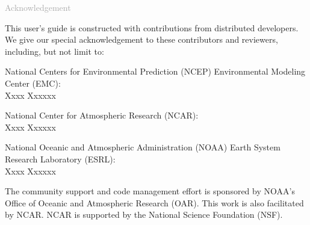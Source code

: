 \begin{titlepage}
\vspace*{0.5cm}
\noindent

\begin{flushleft}
\textcolor{darkgray}{\LARGE Acknowledgement}
\vspace*{1cm}\par

This user's guide is constructed with contributions from distributed developers. We give our special acknowledgement to these contributors and reviewers, including, but not limit to:

National Centers for Environmental Prediction (NCEP) Environmental Modeling Center (EMC): \\
Xxxx Xxxxxx

National Center for Atmospheric Research (NCAR): \\
Xxxx Xxxxxx

National Oceanic and Atmospheric Administration (NOAA) Earth System Research Laboratory (ESRL): \\
Xxxx Xxxxxx

The community support and code management effort is sponsored by NOAA's Office of Oceanic and Atmospheric Research (OAR). This work is also facilitated by NCAR. NCAR is supported by the National Science Foundation (NSF).

\end{flushleft}
\end{titlepage}
\pagebreak{}




